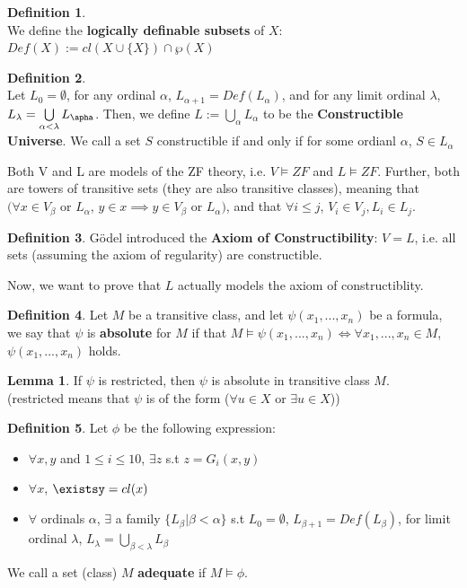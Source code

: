 \documentclass[12pt]{article}
\theoremstyle{definition}
\newtheorem{definition}{Definition}[section]
\newtheorem{lemma}{Lemma}[section]
\begin{document}
\begin{definition}
   \\We define the \textbf{logically definable subsets} of $X$:\\ $Def(X):= cl(X\cup \{X\}) \cap \wp (X)$
\end{definition}
\begin{definition}
    \\Let $L_0=\emptyset$, for any ordinal $\alpha$, $L_{\alpha +1}=Def(L_\alpha)$, and for any limit ordinal $\lambda$, $L_\lambda=\bigcup\limits_{\alpha < \lambda} L_\apha$. Then, we define $L:=\bigcup\limits_{\alpha} L_\alpha$ to be the \textbf{Constructible Universe}. We call a set $S$ constructible if and only if for some ordianl $\alpha$, $S\in L_\alpha$
\end{definition}
Both V and L are models of the ZF theory, i.e. $V\models ZF$ and $L\models ZF$. Further, both are towers of transitive sets (they are also transitive classes), meaning that $(\forall x\in V_\beta$ or $L_\alpha$, $y\in x \implies y \in V_\beta$ or $L_\alpha)$, and that $\forall i\leq j$, $V_i\in V_j, L_i\in L_j$.  
\begin{definition}
    Gödel introduced the \textbf{Axiom of Constructibility}: $V=L$, i.e. all sets (assuming the axiom of regularity) are constructible.
\end{definition}
Now, we want to prove that $L$ actually models the axiom of constructiblity. 
\begin{definition}
    Let $M$ be a transitive class, and let $\psi(x_1,...,x_n)$ be a formula, we say that $\psi$ is \textbf{absolute} for $M$ if that $M\models \psi(x_1,...,x_n) \iff \forall x_1,...,x_n\in M$, $\psi(x_1,...,x_n)$ holds.
\end{definition}
\begin{lemma}
If $\psi$ is restricted, then $\psi$ is absolute in transitive class $M$. \\(restricted means that $\psi$ is of the form ($\forall u\in X$ or $\exists u\in X$))
\end{lemma}
\begin{definition}
    Let $\phi$ be the following expression: 
    \begin{itemize}
        \item $\forall x,y$ and $1\leq i \leq 10$, $\exists z$ s.t $z=G_i(x,y)$
        \item $\forall x$, $\existsy=cl(x)$
        \item $\forall$ ordinals $\alpha$, $\exists$ a family $\{L_\beta|\beta < \alpha\}$ s.t $L_0=\emptyset$, $L_{\beta+1}=Def(L_\beta)$, for limit ordinal $\lambda$, $L_\lambda=\bigcup\limits_{\beta<\lambda}L_\beta$
    \end{itemize}
    We call a set (class) $M$ \textbf{adequate} if $M\models \phi$.
\end{definition}
\end{document}
